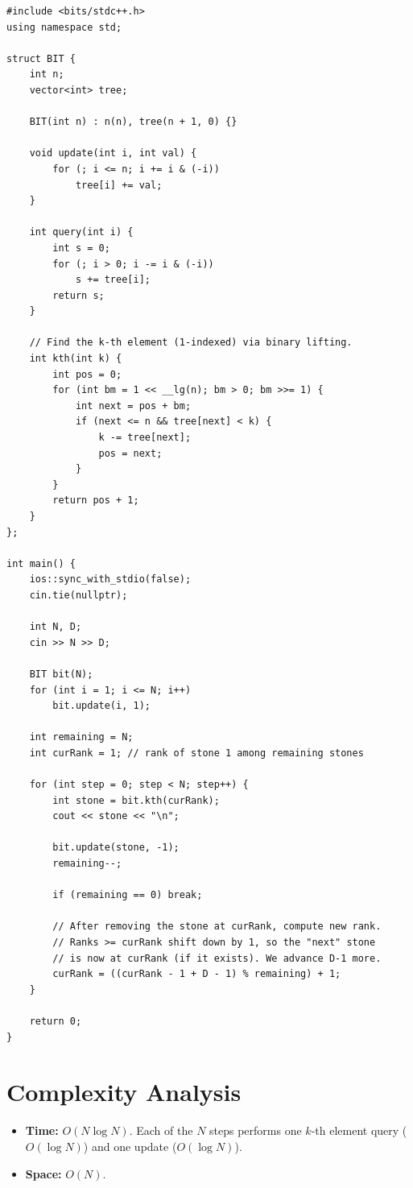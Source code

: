 \documentclass[11pt,a4paper]{article}
\begin{document}
\begin{lstlisting}
#include <bits/stdc++.h>
using namespace std;

struct BIT {
    int n;
    vector<int> tree;

    BIT(int n) : n(n), tree(n + 1, 0) {}

    void update(int i, int val) {
        for (; i <= n; i += i & (-i))
            tree[i] += val;
    }

    int query(int i) {
        int s = 0;
        for (; i > 0; i -= i & (-i))
            s += tree[i];
        return s;
    }

    // Find the k-th element (1-indexed) via binary lifting.
    int kth(int k) {
        int pos = 0;
        for (int bm = 1 << __lg(n); bm > 0; bm >>= 1) {
            int next = pos + bm;
            if (next <= n && tree[next] < k) {
                k -= tree[next];
                pos = next;
            }
        }
        return pos + 1;
    }
};

int main() {
    ios::sync_with_stdio(false);
    cin.tie(nullptr);

    int N, D;
    cin >> N >> D;

    BIT bit(N);
    for (int i = 1; i <= N; i++)
        bit.update(i, 1);

    int remaining = N;
    int curRank = 1; // rank of stone 1 among remaining stones

    for (int step = 0; step < N; step++) {
        int stone = bit.kth(curRank);
        cout << stone << "\n";

        bit.update(stone, -1);
        remaining--;

        if (remaining == 0) break;

        // After removing the stone at curRank, compute new rank.
        // Ranks >= curRank shift down by 1, so the "next" stone
        // is now at curRank (if it exists). We advance D-1 more.
        curRank = ((curRank - 1 + D - 1) % remaining) + 1;
    }

    return 0;
}
\end{lstlisting}

\section{Complexity Analysis}
\begin{itemize}
  \item \textbf{Time:} $O(N \log N)$. Each of the $N$ steps performs
        one $k$-th element query ($O(\log N)$) and one update
        ($O(\log N)$).
  \item \textbf{Space:} $O(N)$.
\end{itemize}
\end{document}

